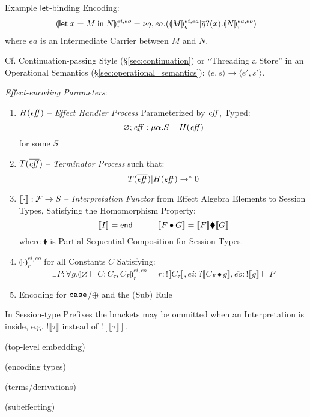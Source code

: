 Example $\mathsf{let}$-binding Encoding:
\[
  \llparenthesis \mathsf{let}\; x = M \;\mathsf{in}\; N \rrparenthesis_r^{ei,eo}
    = \nu q, ea.(\llparenthesis M \rrparenthesis_q^{ei,ea}
      | \overline{q}?(x).\llparenthesis N \rrparenthesis_r^{ea,eo})
\]
where $ea$ is an Intermediate Carrier between $M$ and $N$.

\fist Cf. Continuation-passing Style (\S\ref{sec:continuation}) or
``Threading a Store'' in an Operational Semantics
(\S\ref{sec:operational_semantics}): $\langle e,s \rangle \rightarrow
\langle e',s' \rangle$.

\emph{Effect-encoding Parameters}:
\begin{enumerate}
  \item $H(\text{\emph{eff}})$ -- \emph{Effect Handler Process} Parameterized by
    $\text{\emph{eff}}$, Typed:
    \[
      \varnothing; \text{\emph{eff}} : \mu\alpha.S \vdash H(\text{\emph{eff}})
    \]
    for some $S$
  \item $T(\overline{\text{\emph{eff}}})$ -- \emph{Terminator Process} such that:
    \[
      T(\overline{\text{\emph{eff}}}) | H(\text{\emph{eff}}) \rightarrow^* 0
    \]
  \item $\llbracket\cdot\rrbracket : \mathcal{F} \rightarrow S$ --
    \emph{Interpretation Functor} from Effect Algebra Elements to
    Session Types, Satisfying the Homomorphism Property:
    \[
      \llbracket I \rrbracket = \mathsf{end} \quad\quad\quad
      \llbracket F \bullet G \rrbracket
        = \llbracket F \rrbracket \blacklozenge \llbracket G \rrbracket
    \]
    where $\blacklozenge$ is Partial Sequential Composition for
    Session Types.
  \item $\llparenthesis\cdot \rrparenthesis_r^{ei,eo}$ for all
    Constants $C$ Satisfying:
    \[
      \exists P : \forall g.\llparenthesis \varnothing
          \vdash C:C_\tau,C_F \rrparenthesis_r^{ei,eo}
        = r:!\llbracket C_\tau \rrbracket,
          ei:?\llbracket C_F \bullet g \rrbracket,
          \overline{eo}:!\llbracket g \rrbracket \vdash P
    \]
  \item Encoding for $\mathtt{case}$/$\oplus$ and the (Sub) Rule
\end{enumerate}

\fist In Session-type Prefixes the brackets may be ommitted when an
Interpretation is inside, e.g. $!\llbracket\tau\rrbracket$ instead of
$![\llbracket\tau\rrbracket]$.

(top-level embedding) %

(encoding types) %

(terms/derivations) %

(subeffecting) %

